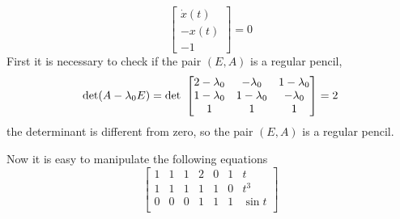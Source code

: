 \begin{example}
\begin{equation}
				\begin{bmatrix}
					\dot{x}(t) \\
					- x(t) \\
					-1 
				\end{bmatrix}
				= 0
			\end{equation}
			First it is necessary to check if the  pair $(E,A)$ is a regular pencil, 
			\begin{equation}
				\textnormal{det}(A-\lambda_{0}E) = \textnormal{det}~
				\begin{bmatrix}
					2-\lambda_{0} 	&  -\lambda_{0} 	&	  1-\lambda_{0} \\ 
					1-\lambda_{0} 	&  1-\lambda_{0}  	&  -\lambda_{0} \\
					1 				& 1 				& 1
				\end{bmatrix} = 2
			\end{equation}
			the determinant is different from zero, so the pair $(E,A)$ is a regular pencil.
			
			
			Now it is easy to manipulate the following equations
			\begin{equation}
				\begin{bmatrix}
					1 & 1 & 1 & 2 & 0 & 1 & t\\
					1 & 1 & 1 & 1 & 1 & 0 & t^3\\
					0 & 0 & 0 & 1 & 1 & 1 & \sin{t}\\
				\end{bmatrix}
			\end{equation}
		\end{example}
		